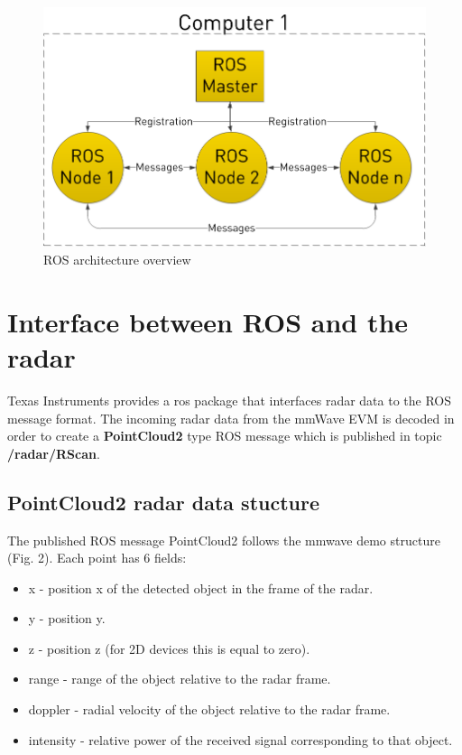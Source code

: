\documentclass[12pt]{article}
\begin{document}
\begin{figure}[!htb]
    \centering
    \includegraphics[scale=0.28]{ros_graph.png}
    \caption{ROS architecture overview}
    \label{fig:ros_concepts}
\end{figure}
\section{Interface between ROS and the radar}
Texas Instruments provides a ros package that interfaces radar data to the ROS message format. The incoming radar data from the mmWave EVM is decoded in order to create a \textbf{PointCloud2} type ROS message which is published in topic \textbf{/radar/RScan}.

\subsection{PointCloud2 radar data stucture}

The published ROS message PointCloud2 follows the mmwave demo structure (Fig. 2). Each point has 6 fields:
\begin{itemize}
\item x - position x of the detected  object in the frame of the radar.
\item y - position y.
\item z - position z (for 2D devices this is equal to zero).
\item range - range of the object relative to the radar frame.
\item doppler - radial velocity of the object relative to the radar frame.
\item intensity - relative power of the received signal corresponding to that object.
\end{itemize}
\end{document}

